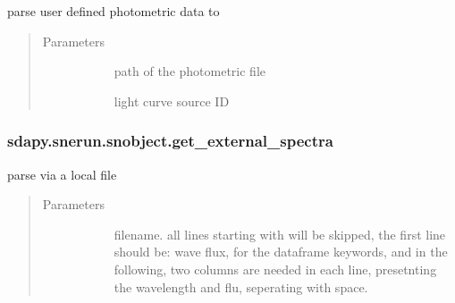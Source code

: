 \documentclass[letterpaper,10pt,english]{sphinxmanual}
\begin{document}
\begin{fulllineitems}
\begin{fulllineitems}
\label{\detokenize{generated/sdapy.snerun.snobject.get_external_phot:sdapy.snerun.snobject.get_external_phot}}
parse user defined photometric data to 
\begin{quote}\begin{description}
\item[{Parameters}] \leavevmode\begin{description}
\item[{}] \leavevmode{[}\sphinxtitleref{str}{]}
path of the photometric file

\item[{}] \leavevmode{[}\sphinxtitleref{float}{]}
light curve source ID

\end{description}

\end{description}\end{quote}

\end{fulllineitems}



\subsubsection{sdapy.snerun.snobject.get\_external\_spectra}
\label{\detokenize{generated/sdapy.snerun.snobject.get_external_spectra:sdapy-snerun-snobject-get-external-spectra}}\label{\detokenize{generated/sdapy.snerun.snobject.get_external_spectra::doc}}

\begin{fulllineitems}
\label{\detokenize{generated/sdapy.snerun.snobject.get_external_spectra:sdapy.snerun.snobject.get_external_spectra}}
parse  via a local file
\begin{quote}\begin{description}
\item[{Parameters}] \leavevmode\begin{description}
\item[{}] \leavevmode{[}\sphinxtitleref{str}{]}
filename.
all lines starting with \sphinxstylestrong{\#} will be skipped,
the first line should be: wave flux,
for the dataframe keywords, and in the following,
two columns are needed in each line, presetnting the wavelength and flu,
seperating with space.


\end{description}
\end{description}
\end{quote}
\end{fulllineitems}
\end{fulllineitems}
\end{document}
